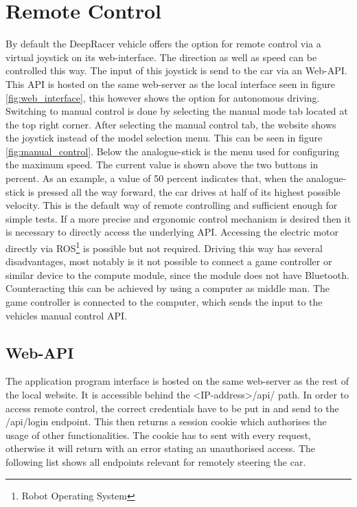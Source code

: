 \section{Remote Control}
By default the DeepRacer vehicle offers the option for remote control via a virtual joystick on its web-interface. The direction as well as speed can be controlled this way. The input of this joystick is send to the car via an Web-API. This API is hosted on the same web-server as the local interface seen in figure \ref{fig:web_interface}, this however shows the option for autonomous driving. Switching to manual control is done by selecting the manual mode tab located at the top right corner. After selecting the manual control tab, the website shows the joystick instead of the model selection menu. This can be seen in figure \ref{fig:manual_control}. Below the analogue-stick is the menu used for configuring the maximum speed. The current value is shown above the two buttons in percent. As an example, a value of 50 percent indicates that, when the analogue-stick is pressed all the way forward, the car drives at half of its highest possible velocity. This is the default way of remote controlling and sufficient enough for simple tests. If a more precise and ergonomic control mechanism is desired then it is necessary to directly access the underlying API. Accessing the  electric motor directly via ROS\footnote{Robot Operating System} is possible but not required. Driving this way has several disadvantages, most notably is it not possible to connect a game controller or similar device to the compute module, since the module does not have Bluetooth. Counteracting this can be achieved by using a computer as middle man. The game controller is connected to the computer, which sends the input to the vehicles manual control API.

\subsection{Web-API}
The application program interface is hosted on the same web-server as the rest of the local website. It is accessible behind the <IP-address>/api/ path. In order to access remote control, the correct credentials have to be put in and send to the /api/login endpoint. This then returns a session cookie which authorises the usage of other functionalities. The cookie has to sent with every request, otherwise it will return with an error stating an unauthorised access. The following list shows all endpoints relevant for remotely steering the car.

